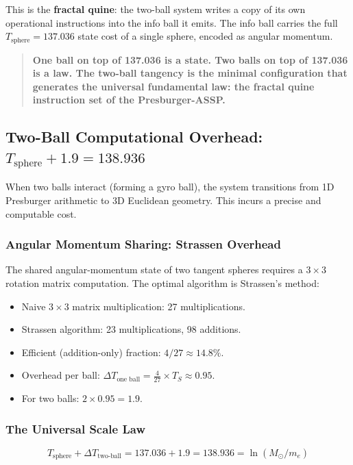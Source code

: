 \documentclass[11pt,a4paper]{article}
\begin{document}
This is the \textbf{fractal quine}: the two-ball system writes a copy of its own
operational instructions into the info ball it emits. The info ball carries the
full $T_{\text{sphere}} = 137.036$ state cost of a single sphere, encoded as
angular momentum.

\begin{quote}
\textbf{One ball on top of 137.036 is a state. Two balls on top of 137.036 is a
law. The two-ball tangency is the minimal configuration that generates the universal
fundamental law: the fractal quine instruction set of the Presburger-ASSP.}
\end{quote}

\subsection{Two-Ball Computational Overhead: $T_{\text{sphere}} + 1.9 = 138.936$}

When two balls interact (forming a gyro ball), the system transitions from 1D
Presburger arithmetic to 3D Euclidean geometry. This incurs a precise and
computable cost.

\subsubsection{Angular Momentum Sharing: Strassen Overhead}

The shared angular-momentum state of two tangent spheres requires a $3\times3$
rotation matrix computation. The optimal algorithm is Strassen's method:
\begin{itemize}
  \item Naive $3\times3$ matrix multiplication: 27 multiplications.
  \item Strassen algorithm: 23 multiplications, 98 additions.
  \item Efficient (addition-only) fraction: $4/27 \approx 14.8\%$.
  \item Overhead per ball: $\Delta T_{\text{one ball}} = \tfrac{4}{27}\times
        T_S \approx 0.95$.
  \item For two balls: $2\times0.95 = 1.9$.
\end{itemize}

\subsubsection{The Universal Scale Law}

\begin{equation}
  \boxed{T_{\text{sphere}} + \Delta T_{\text{two-ball}}
    = 137.036 + 1.9 = 138.936 = \ln(M_\odot / m_e)}
  \label{eq:138}
\end{equation}
\end{document}

